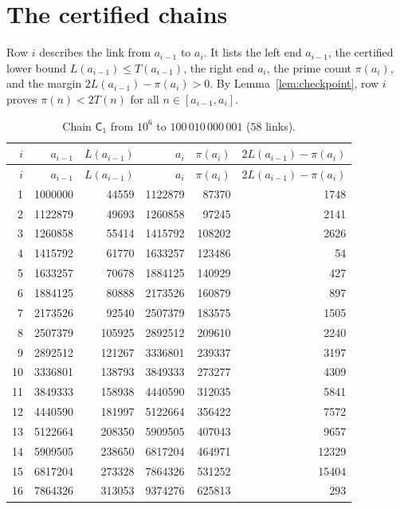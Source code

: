 \documentclass[11pt,a4paper]{article}
\theoremstyle{definition}
\begin{document}
\appendix

\section{The certified chains}\label{app:chains}

Row $i$ describes the link from $a_{i-1}$ to $a_i$. It lists the left end $a_{i-1}$, the certified lower bound $L(a_{i-1})\le T(a_{i-1})$, the right end $a_i$, the prime count $\pi(a_i)$, and the margin $2L(a_{i-1})-\pi(a_i)>0$. By Lemma~\ref{lem:checkpoint}, row $i$ proves $\pi(n)<2T(n)$ for all $n\in[a_{i-1},a_i]$.

{\scriptsize
\setlength{\tabcolsep}{4pt}
\begin{longtable}{rrrrrr}
\caption{Chain $\mathsf C_1$ from $10^6$ to $100\,010\,000\,001$ ($58$ links).}\label{tab:chain1}\\
\toprule
$i$ & $a_{i-1}$ & $L(a_{i-1})$ & $a_{i}$ & $\pi(a_{i})$ & $2L(a_{i-1})-\pi(a_{i})$\\
\midrule
\endfirsthead
\toprule
$i$ & $a_{i-1}$ & $L(a_{i-1})$ & $a_{i}$ & $\pi(a_{i})$ & $2L(a_{i-1})-\pi(a_{i})$\\
\midrule
\endhead
1 & 1000000 & 44559 & 1122879 & 87370 & 1748 \\
2 & 1122879 & 49693 & 1260858 & 97245 & 2141 \\
3 & 1260858 & 55414 & 1415792 & 108202 & 2626 \\
4 & 1415792 & 61770 & 1633257 & 123486 & 54 \\
5 & 1633257 & 70678 & 1884125 & 140929 & 427 \\
6 & 1884125 & 80888 & 2173526 & 160879 & 897 \\
7 & 2173526 & 92540 & 2507379 & 183575 & 1505 \\
8 & 2507379 & 105925 & 2892512 & 209610 & 2240 \\
9 & 2892512 & 121267 & 3336801 & 239337 & 3197 \\
10 & 3336801 & 138793 & 3849333 & 273277 & 4309 \\
11 & 3849333 & 158938 & 4440590 & 312035 & 5841 \\
12 & 4440590 & 181997 & 5122664 & 356422 & 7572 \\
13 & 5122664 & 208350 & 5909505 & 407043 & 9657 \\
14 & 5909505 & 238650 & 6817204 & 464971 & 12329 \\
15 & 6817204 & 273328 & 7864326 & 531252 & 15404 \\
16 & 7864326 & 313053 & 9374276 & 625813 & 293 \\

\end{longtable}}
\end{document}
